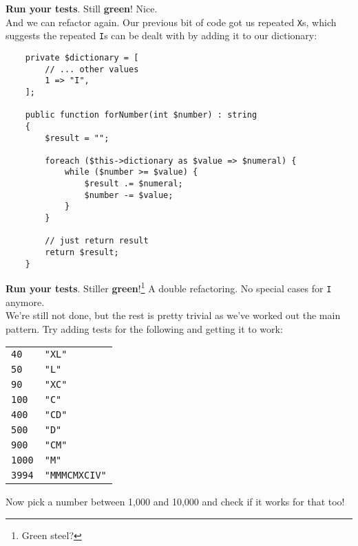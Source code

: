 \textbf{Run your tests}. Still \textbf{green}! Nice.
\\

And we can refactor again. Our previous bit of code got us repeated \texttt{X}s, which suggests the repeated \texttt{I}s can be dealt with by adding it to our dictionary:

\begin{verbatim}
    private $dictionary = [
        // ... other values
        1 => "I",
    ];

    public function forNumber(int $number) : string
    {
        $result = "";

        foreach ($this->dictionary as $value => $numeral) {
            while ($number >= $value) {
                $result .= $numeral;
                $number -= $value;
            }
        }

        // just return result
        return $result;
    }
\end{verbatim}

\textbf{Run your tests}. Stiller \textbf{green}!\footnote{Green steel?} A double refactoring. No special cases for \texttt{I} anymore.
\\

We're still not done, but the rest is pretty trivial as we've worked out the main pattern. Try adding tests for the following and getting it to work:
\\

\begin{small}
    \begin{tabularx}{\textwidth}{l X}
        \texttt{40} & \texttt{"XL"} \\
        \texttt{50} & \texttt{"L"} \\
        \texttt{90} & \texttt{"XC"} \\
        \texttt{100} & \texttt{"C"} \\
        \texttt{400} & \texttt{"CD"} \\
        \texttt{500} & \texttt{"D"} \\
        \texttt{900} & \texttt{"CM"} \\
        \texttt{1000} & \texttt{"M"} \\
        \texttt{3994} & \texttt{"MMMCMXCIV"} \\
    \end{tabularx}
\end{small}

\par\bigskip

Now pick a number between 1,000 and 10,000 and check if it works for that too!
\\

